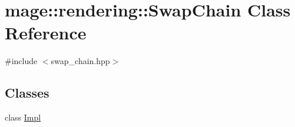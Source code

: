 \hypertarget{classmage_1_1rendering_1_1_swap_chain}{}\section{mage\+:\+:rendering\+:\+:Swap\+Chain Class Reference}
\label{classmage_1_1rendering_1_1_swap_chain}


{\ttfamily \#include $<$swap\+\_\+chain.\+hpp$>$}

\subsection*{Classes}
\begin{DoxyCompactItemize}
\item 
class \mbox{\hyperlink{classmage_1_1rendering_1_1_swap_chain_1_1_impl}{Impl}}
\end{DoxyCompactItemize}
